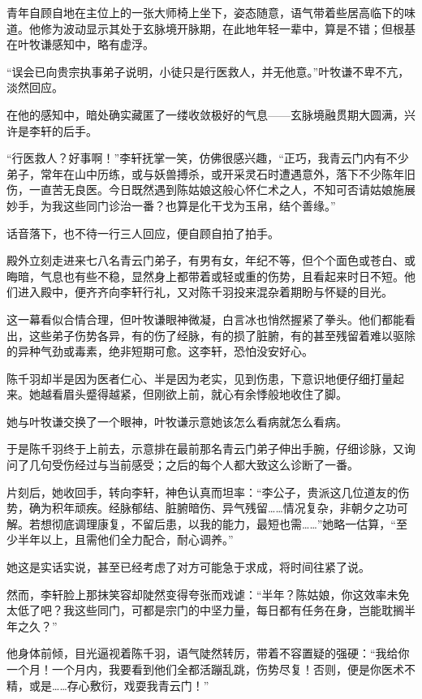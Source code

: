 青年自顾自地在主位上的一张大师椅上坐下，姿态随意，语气带着些居高临下的味道。他修为波动显示其处于玄脉境开脉期，在此地年轻一辈中，算是不错；但根基在叶牧谦感知中，略有虚浮。

“误会已向贵宗执事弟子说明，小徒只是行医救人，并无他意。”叶牧谦不卑不亢，淡然回应。

在他的感知中，暗处确实藏匿了一缕收敛极好的气息——玄脉境融贯期大圆满，兴许是李轩的后手。

“行医救人？好事啊！”李轩抚掌一笑，仿佛很感兴趣，“正巧，我青云门内有不少弟子，常年在山中历练，或与妖兽搏杀，或开采灵石时遭遇意外，落下不少陈年旧伤，一直苦无良医。今日既然遇到陈姑娘这般心怀仁术之人，不知可否请姑娘施展妙手，为我这些同门诊治一番？也算是化干戈为玉帛，结个善缘。”

话音落下，也不待一行三人回应，便自顾自拍了拍手。

殿外立刻走进来七八名青云门弟子，有男有女，年纪不等，但个个面色或苍白、或晦暗，气息也有些不稳，显然身上都带着或轻或重的伤势，且看起来时日不短。他们进入殿中，便齐齐向李轩行礼，又对陈千羽投来混杂着期盼与怀疑的目光。

这一幕看似合情合理，但叶牧谦眼神微凝，白言冰也悄然握紧了拳头。他们都能看出，这些弟子伤势各异，有的伤了经脉，有的损了脏腑，有的甚至残留着难以驱除的异种气劲或毒素，绝非短期可愈。这李轩，恐怕没安好心。

陈千羽却半是因为医者仁心、半是因为老实，见到伤患，下意识地便仔细打量起来。她越看眉头蹙得越紧，但刚欲上前，就心有余悸般地收住了脚。

她与叶牧谦交换了一个眼神，叶牧谦示意她该怎么看病就怎么看病。

于是陈千羽终于上前去，示意排在最前那名青云门弟子伸出手腕，仔细诊脉，又询问了几句受伤经过与当前感受；之后的每个人都大致这么诊断了一番。

片刻后，她收回手，转向李轩，神色认真而坦率：“李公子，贵派这几位道友的伤势，确为积年顽疾。经脉郁结、脏腑暗伤、异气残留……情况复杂，非朝夕之功可解。若想彻底调理康复，不留后患，以我的能力，最短也需……”她略一估算，“至少半年以上，且需他们全力配合，耐心调养。”

她这是实话实说，甚至已经考虑了对方可能急于求成，将时间往紧了说。

然而，李轩脸上那抹笑容却陡然变得夸张而戏谑：“半年？陈姑娘，你这效率未免太低了吧？我这些同门，可都是宗门的中坚力量，每日都有任务在身，岂能耽搁半年之久？”

他身体前倾，目光逼视着陈千羽，语气陡然转厉，带着不容置疑的强硬：“我给你一个月！一个月内，我要看到他们全都活蹦乱跳，伤势尽复！否则，便是你医术不精，或是……存心敷衍，戏耍我青云门！”

